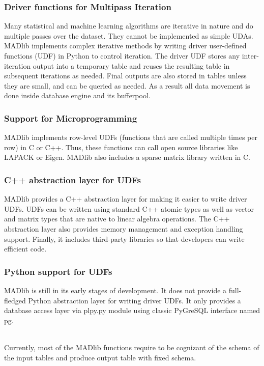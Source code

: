 \subsubsection*{Driver functions for Multipass Iteration}
Many statistical and machine learning algorithms are iterative in nature and do multiple passes over the dataset. They cannot be implemented as simple UDAs. MADlib implements complex iterative methods by writing driver user-defined functions (UDF) in Python to control iteration. The driver UDF stores any inter-iteration output into a temporary table and reuses the resulting table in subsequent iterations as needed. Final outputs are also stored in tables unless they are small, and can be queried as needed. As a result all data movement is done inside database engine and its bufferpool.

\subsubsection*{Support for Microprogramming}
MADlib implements row-level UDFs (functions that are called multiple times per row) in C or C++. Thus, these functions can call open source libraries like LAPACK or Eigen. MADlib also includes a sparse matrix library written in C.

\subsubsection*{C++ abstraction layer for UDFs} 
MADlib provides a C++ abstraction layer for making it easier to write driver UDFs. UDFs can be written using standard C++ atomic types as well as vector and matrix types that are native to linear algebra operations. The C++ abstraction layer also provides memory management and exception handling support. Finally, it includes third-party libraries so that developers can write efficient code.

\subsubsection*{Python support for UDFs}
MADlib is still in its early stages of development. It does not provide a full-fledged Python abstraction layer for writing driver UDFs. It only provides a database access layer via {\ttfamily plpy.py} module using classic PyGreSQL interface named {\ttfamily pg}. 

~~\\
Currently, most of the MADlib functions require to be cognizant of the schema of the input tables and produce output table with fixed schema. 

